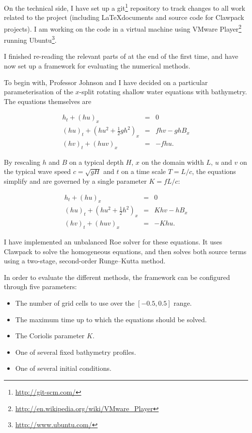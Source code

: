 \documentclass[a4paper,onecolumn,11pt]{article}
\begin{document}
On the technical side, I have set up a git\footnote{\url{http://git-scm.com/}} repository to track changes to all work related to the project (including \LaTeX documents and source code for Clawpack projects). I am working on the code in a virtual machine using VMware Player\footnote{\url{http://en.wikipedia.org/wiki/VMware_Player}} running Ubuntu\footnote{\url{http://www.ubuntu.com/}}.

I finished re-reading the relevant parts of \citet{leveque2002finite} at the end of the first time, and have now set up a framework for evaluating the numerical methods.

To begin with, Professor Johnson and I have decided on a particular parameterisation of the $x$-split rotating shallow water equations with bathymetry. The equations themselves are

\begin{eqnarray*}
  h_t + (hu)_x & = & 0 \\
  (hu)_t + \left(hu^2 + \frac{1}{2}gh^2\right)_x & = & fhv - gh B_x \\
  (hv)_t + (huv)_x &=& -fhu.
\end{eqnarray*}

By rescaling $h$ and $B$ on a typical depth $H$, $x$ on the domain width $L$, $u$ and $v$ on the typical wave speed $c = \sqrt{gH}$ and $t$ on a time scale $T = L/c$, the equations simplify and are governed by a single parameter $K = fL/c$:

\begin{eqnarray*}
  h_t + (hu)_x & = & 0 \\
  (hu)_t + \left(hu^2 + \frac{1}{2}h^2\right)_x & = & Khv - h B_x \\
  (hv)_t + (huv)_x &=& -Khu.
\end{eqnarray*}

I have implemented an unbalanced Roe solver for these equations. It uses Clawpack to solve the homogeneous equations, and then solves both source terms using a two-stage, second-order Runge--Kutta method.

In order to evaluate the different methods, the framework can be configured through five parameters:

\begin{itemize}
  \item The number of grid cells to use over the $[-0.5, 0.5]$ range.
  \item The maximum time up to which the equations should be solved.
  \item The Coriolis parameter $K$.
  \item One of several fixed bathymetry profiles.
  \item One of several initial conditions.
\end{itemize}
\end{document}
